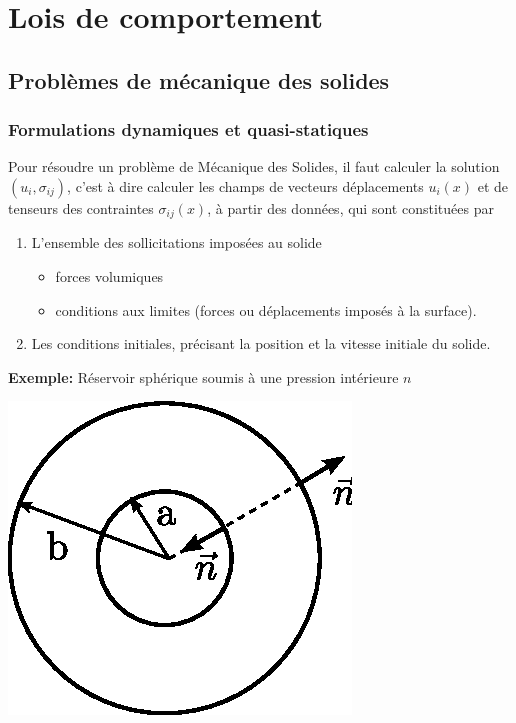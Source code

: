\chapter{Lois de comportement} \label{chap:Ch04}
\section{Problèmes de mécanique des solides} \label{sec:Ch04-1}
\subsection{Formulations dynamiques et quasi-statiques}  \label{ssec:Ch04-1.1}
Pour résoudre un problème de Mécanique des Solides, il faut calculer la solution $(u_i, \sigma_{ij})$, c'est à dire calculer les champs de vecteurs déplacements $u_i(x)$ et de tenseurs des contraintes $\sigma_{ij}(x)$, à partir des données, qui sont constituées par
\begin{enumerate}
    \item L'ensemble des sollicitations imposées au solide
        \begin{itemize}
            \item forces volumiques
            \item conditions aux limites (forces ou déplacements imposés à la surface).
        \end{itemize}
    \item Les conditions initiales, précisant la position et la vitesse initiale du solide.
\end{enumerate}
\textbf{Exemple:} Réservoir sphérique soumis à une pression intérieure $n$
\begin{center}
    \includegraphics{../images/T1_Ch04-0001}
\end{center}
